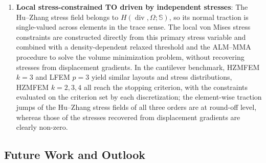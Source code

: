 \begin{enumerate}
    \item \textbf{Local stress-constrained TO driven by independent stresses}: The Hu--Zhang stress field belongs to $H(\operatorname{div},\Omega;\mathbb S)$, so its normal traction is single-valued across elements in the trace sense. The local von Mises stress constraints are constructed directly from this primary stress variable and combined with a density-dependent relaxed threshold and the ALM--MMA procedure to solve the volume minimization problem, without recovering stresses from displacement gradients. In the cantilever benchmark, HZMFEM $k=3$ and LFEM $p=3$ yield similar layouts and stress distributions, HZMFEM $k=2,3,4$ all reach the stopping criterion, with the constraints evaluated on the criterion set by each discretization; the element-wise traction jumps of the Hu--Zhang stress fields of all three orders are at round-off level, whereas those of the stresses recovered from displacement gradients are clearly non-zero.
\end{enumerate}

\subsection{Future Work and Outlook}
\label{subsec:future_work}

